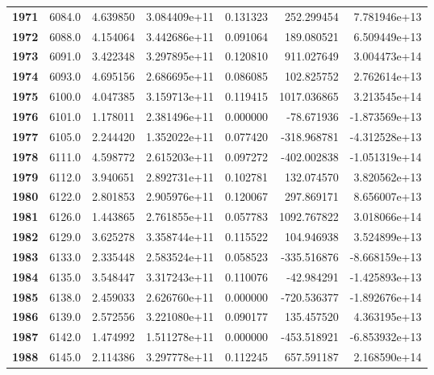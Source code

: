 \documentclass{report}[12pt]
\begin{document}
\begin{center}
\begin{tabular}{lrrrrrr}
\textbf{1971} &         6084.0 &   4.639850 &  3.084409e+11 &    0.131323 &   252.299454 &  7.781946e+13 \\
\textbf{1972} &         6088.0 &   4.154064 &  3.442686e+11 &    0.091064 &   189.080521 &  6.509449e+13 \\
\textbf{1973} &         6091.0 &   3.422348 &  3.297895e+11 &    0.120810 &   911.027649 &  3.004473e+14 \\
\textbf{1974} &         6093.0 &   4.695156 &  2.686695e+11 &    0.086085 &   102.825752 &  2.762614e+13 \\
\textbf{1975} &         6100.0 &   4.047385 &  3.159713e+11 &    0.119415 &  1017.036865 &  3.213545e+14 \\
\textbf{1976} &         6101.0 &   1.178011 &  2.381496e+11 &    0.000000 &   -78.671936 & -1.873569e+13 \\
\textbf{1977} &         6105.0 &   2.244420 &  1.352022e+11 &    0.077420 &  -318.968781 & -4.312528e+13 \\
\textbf{1978} &         6111.0 &   4.598772 &  2.615203e+11 &    0.097272 &  -402.002838 & -1.051319e+14 \\
\textbf{1979} &         6112.0 &   3.940651 &  2.892731e+11 &    0.102781 &   132.074570 &  3.820562e+13 \\
\textbf{1980} &         6122.0 &   2.801853 &  2.905976e+11 &    0.120067 &   297.869171 &  8.656007e+13 \\
\textbf{1981} &         6126.0 &   1.443865 &  2.761855e+11 &    0.057783 &  1092.767822 &  3.018066e+14 \\
\textbf{1982} &         6129.0 &   3.625278 &  3.358744e+11 &    0.115522 &   104.946938 &  3.524899e+13 \\
\textbf{1983} &         6133.0 &   2.335448 &  2.583524e+11 &    0.058523 &  -335.516876 & -8.668159e+13 \\
\textbf{1984} &         6135.0 &   3.548447 &  3.317243e+11 &    0.110076 &   -42.984291 & -1.425893e+13 \\
\textbf{1985} &         6138.0 &   2.459033 &  2.626760e+11 &    0.000000 &  -720.536377 & -1.892676e+14 \\
\textbf{1986} &         6139.0 &   2.572556 &  3.221080e+11 &    0.090177 &   135.457520 &  4.363195e+13 \\
\textbf{1987} &         6142.0 &   1.474992 &  1.511278e+11 &    0.000000 &  -453.518921 & -6.853932e+13 \\
\textbf{1988} &         6145.0 &   2.114386 &  3.297778e+11 &    0.112245 &   657.591187 &  2.168590e+14 \\

\end{tabular}
\end{center}
\end{document}
